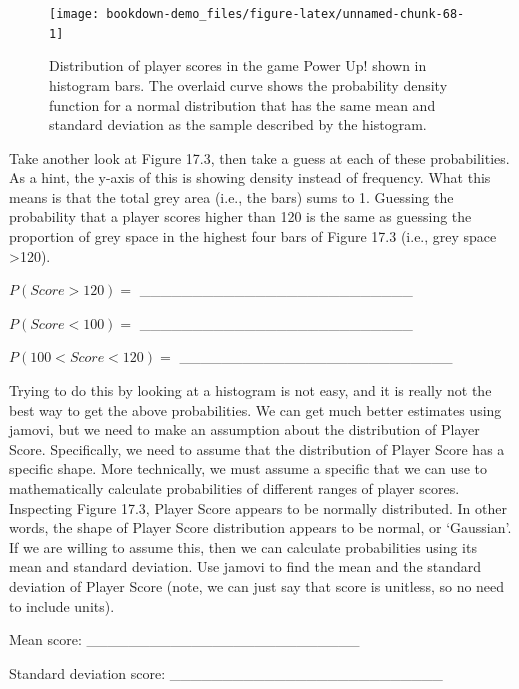 \documentclass[
  openany]{krantz}
\begin{document}
\begin{figure}
\texttt{[image: bookdown-demo\_files/figure-latex/unnamed-chunk-68-1]} \caption{Distribution of player scores in the game Power Up! shown in histogram bars. The overlaid curve shows the probability density function for a normal distribution that has the same mean and standard deviation as the sample described by the histogram.}\label{fig:unnamed-chunk-68}
\end{figure}

Take another look at Figure 17.3, then take a guess at each of these probabilities.
As a hint, the y-axis of this  is showing density instead of frequency.
What this means is that the total grey area (i.e., the  bars) sums to 1.
Guessing the probability that a player scores higher than 120 is the same as guessing the proportion of grey space in the highest four bars of Figure 17.3 (i.e., grey space \textgreater120).

\(P(Score>120) =\) \_\_\_\_\_\_\_\_\_\_\_\_\_\_\_\_\_\_\_\_\_\_\_\_\_\_

\(P(Score<100) =\) \_\_\_\_\_\_\_\_\_\_\_\_\_\_\_\_\_\_\_\_\_\_\_\_\_\_

\(P(100<Score<120) =\) \_\_\_\_\_\_\_\_\_\_\_\_\_\_\_\_\_\_\_\_\_\_\_\_\_\_

Trying to do this by looking at a histogram is not easy, and it is really not the best way to get the above probabilities.
We can get much better estimates using jamovi, but we need to make an assumption about the distribution of Player Score.
Specifically, we need to assume that the distribution of Player Score has a specific shape.
More technically, we must assume a specific  that we can use to mathematically calculate probabilities of different ranges of player scores.
Inspecting Figure 17.3, Player Score appears to be normally distributed.
In other words, the shape of Player Score distribution appears to be normal, or `Gaussian'.
If we are willing to assume this, then we can calculate probabilities using its mean and standard deviation.
Use jamovi to find the mean and the standard deviation of Player Score (note, we can just say that score is unitless, so no need to include units).

Mean score: \_\_\_\_\_\_\_\_\_\_\_\_\_\_\_\_\_\_\_\_\_\_\_\_\_\_

Standard deviation score: \_\_\_\_\_\_\_\_\_\_\_\_\_\_\_\_\_\_\_\_\_\_\_\_\_\_
\end{document}
